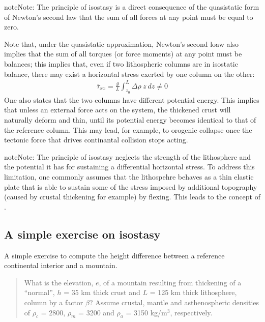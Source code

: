 \documentclass[letterpaper,10pt,english]{jupyterBook}
\begin{document}
\begin{sphinxadmonition}{note}{Note:}
\sphinxAtStartPar
The principle of isostasy is a direct consequence of the quasi\sphinxhyphen{}static form of Newton’s second law that the sum of all forces at any point must be equal to zero.
\end{sphinxadmonition}

\sphinxAtStartPar
Note that, under the quasi\sphinxhyphen{}static approximation, Newton’s second loaw also implies that the sum of all torques (or force moments) at any point must be balances; this implies that, even if two lithospheric columns are in isostatic balance, there may exist a horizontal stress exerted by one column on the other:
\begin{equation*}
\begin{split}\bar\tau_{xx}=\frac{g}{L}\int_{z_0}^L\Delta\rho\ z\ dz\ne 0\end{split}
\end{equation*}
\sphinxAtStartPar
One also states that the two columns have different potential energy. This implies that unless an external force acts on the system, the thickened crust will naturally deform and thin, until its potential energy becomes identical to that of the reference column. This may lead, for example, to orogenic collapse once the tectonic force that drives continantal collision stops acting.

\begin{sphinxadmonition}{note}{Note:}
\sphinxAtStartPar
The principle of isostasy neglects the strength of the lithosphere and the potential it has for sustaining a differential horizontal stress. To address this limitation, one commonly assumes that the lithospehre behaves as a thin elastic plate that is able to sustain some of the stress imposed by additional topography (caused by crustal thickening for example) by flexing. This leads to the concept of .
\end{sphinxadmonition}

\sphinxstepscope


\subsection{A simple exercise on isostasy}
\label{\detokenize{exercise-isostasy:a-simple-exercise-on-isostasy}}\label{\detokenize{exercise-isostasy::doc}}
\sphinxAtStartPar
A simple exercise to compute the height difference between a reference continental interior and a mountain.
\begin{quote}

\sphinxAtStartPar
What is the elevation, \(e\), of a mountain resulting from thickening of a “normal”, \(h\) = 35 km thick crust and \(L\) = 125 km thick lithosphere, column by a factor \(\beta\)? Assume crustal, mantle and asthenospheric densities of \(\rho_c\) = 2800, \(\rho_m\) = 3200 and \(\rho_a\) = 3150 kg/m\(^3\), respectively.
\end{quote}
\end{document}
